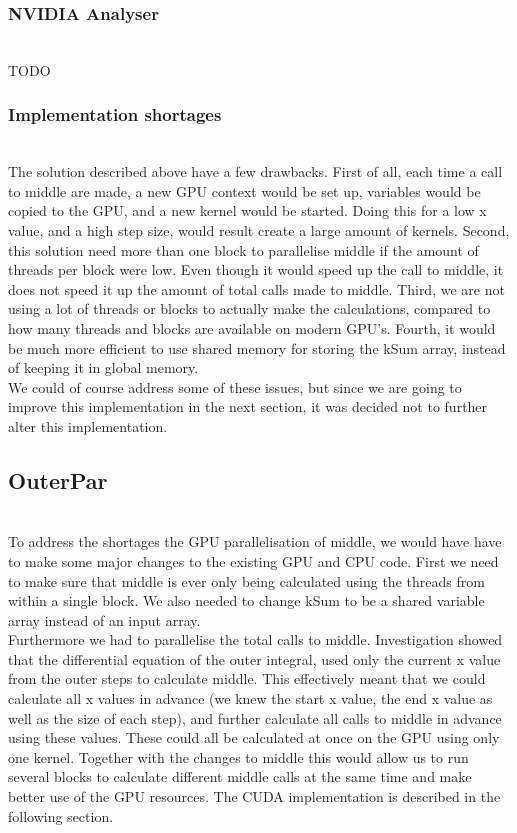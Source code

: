 \subsubsection{NVIDIA Analyser} \hfill \\
TODO

\subsubsection{Implementation shortages} \hfill \\
The solution described above have a few drawbacks. First of all, each time a call to middle are made, a new GPU context would be set up, variables would be copied to the GPU, and a new kernel would be started. Doing this for a low x value, and a high step size, would result create a large amount of kernels. Second, this solution need more than one block to parallelise middle if the amount of threads per block were low. Even though it would speed up the call to middle, it does not speed it up the amount of total calls made to middle. Third, we are not using a lot of threads or blocks to actually make the calculations, compared to how many threads and blocks are available on modern GPU’s. Fourth, it would be much more efficient to use shared memory for storing the kSum array, instead of keeping it in global memory.\\

We could of course address some of these issues, but since we are going to improve this implementation in the next section, it was decided not to further alter this implementation. \\
\subsection{OuterPar} \hfill \\
To address the shortages the GPU parallelisation of middle, we would have have to make some major changes to the existing GPU and CPU code. First we need to make sure that middle is ever only being calculated using the threads from within a single block. We also needed to change kSum to be a shared variable array instead of an input array. \\

Furthermore we had to parallelise the total calls to middle. Investigation showed that the differential equation of the outer integral, used only the current x value from the outer steps to calculate middle. This effectively meant that we could calculate all x values in advance (we knew the start x value, the end x value as well as the size of each step), and further calculate all calls to middle in advance using these values. These could all be calculated at once on the GPU using only one kernel. Together with the changes to middle this would allow us to run several blocks to calculate different middle calls at the same time and make better use of the GPU resources. The CUDA implementation is described in the following section.

